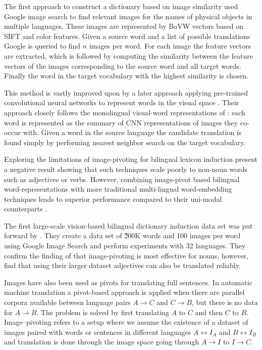 The first approach to construct a dictionary based on image similarity \citep{bergsma2011learning} 
used Google image search to find
relevant images for the names of physical objects in multiple languages.
These images are represented by BoVW vectors based
on SIFT and color features. Given a source word and a list of possible translations
Google is queried to find $n$ images per word. For each image the
feature vectors are extracted, which is followed by computing the similarity
between the feature vectors of the images corresponding to the source word and
all target words. Finally the word in the target vocabulary with the highest
similarity is chosen.

This method is vastly improved upon by a later approach applying
pre-trained convolutional neural networks to represent words
in the visual space \citep{kiela2015visual}. Their approach closely follows
the monolingual visual-word representations of \cite{kiela2014improving}:
each word is represented as the summary of CNN representations of images they
co-occur with. Given a word in the source language the candidate translation is found
simply by performing nearest neighbor search on the target vocabulary.

Exploring the limitations of image-pivoting for bilingual lexicon induction
\cite{hartmann2017limitations} present a negative result
showing that such techniques scale poorly to non-noun words such as
adjectives or verbs. However, combining image-pivot based bilingual
word-representations with more traditional multi-lingual word-embedding
techniques leads to superior performance compared to their uni-modal
counterparts \citep{vulic2016multi}.

The first large-scale vision-based bilingual dictionary induction data set
was put forward by \cite{hewitt2018learning}. They create a data set
of \~200K words and 100 images per word using Google Image Search and perform
experiments with 32 languages.
They confirm the finding of \cite{hartmann2017limitations} that image-pivoting
is most effective for nouns, however, find that using their larger dataset
adjectives can also be translated reliably. 


Images have also been used as pivots for translating full sentences.
In automatic machine translation a pivot-based approach is applied
when there are parallel corpora available between language pairs $A\rightarrow C$
and $C \rightarrow B$, but there is no data for $A\rightarrow B$. The problem is
solved by first translating $A$ to $C$ and then $C$ to $B$.
Image--pivoting refers to a setup where we assume the existence of a dataset
of images paired with words or sentences in different languages $A \leftrightarrow I_A$ and
$B \leftrightarrow I_B$ and translation is done through the image space
going  through $A \rightarrow I$ to $I \rightarrow C$.

